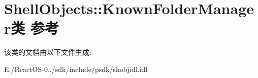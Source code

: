 \hypertarget{class_shell_objects_1_1_known_folder_manager}{}\section{Shell\+Objects\+:\+:Known\+Folder\+Manager类 参考}
\label{class_shell_objects_1_1_known_folder_manager}


该类的文档由以下文件生成\+:\begin{DoxyCompactItemize}
\item 
E\+:/\+React\+O\+S-\/0../sdk/include/psdk/shobjidl.\+idl\end{DoxyCompactItemize}
